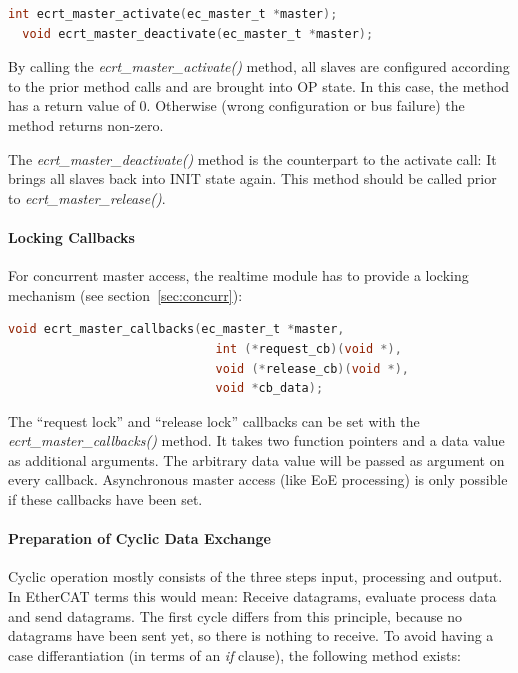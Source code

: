\documentclass[a4paper,12pt,BCOR6mm,bibtotoc,idxtotoc]{scrbook}
\begin{document}
\begin{lstlisting}[language=C]
  int ecrt_master_activate(ec_master_t *master);
  void ecrt_master_deactivate(ec_master_t *master);
\end{lstlisting}

By calling the \textit{ecrt\_master\_activate()} method, all slaves
are configured according to the prior method calls and are brought
into OP state. In this case, the method has a return value of 0.
Otherwise (wrong configuration or bus failure) the method returns
non-zero.

The \textit{ecrt\_master\_deactivate()} method is the counterpart to
the activate call: It brings all slaves back into INIT state again.
This method should be called prior to
\textit{ecrt\_\-master\_\-release()}.

\paragraph{Locking Callbacks}

For concurrent master access, the realtime module has to provide a
locking mechanism (see section~\ref{sec:concurr}):

\begin{lstlisting}[language=C]
  void ecrt_master_callbacks(ec_master_t *master,
                             int (*request_cb)(void *),
                             void (*release_cb)(void *),
                             void *cb_data);
\end{lstlisting}

The ``request lock'' and ``release lock'' callbacks can be set with
the \textit{ecrt\_master\_call\-backs()} method. It takes two function
pointers and a data value as additional arguments. The arbitrary data
value will be passed as argument on every callback. Asynchronous
master access (like EoE processing) is only possible if these
callbacks have been set.

\paragraph{Preparation of Cyclic Data Exchange}

Cyclic operation mostly consists of the three steps input, processing
and output. In EtherCAT terms this would mean: Receive datagrams,
evaluate process data and send datagrams. The first cycle differs from
this principle, because no datagrams have been sent yet, so there is
nothing to receive. To avoid having a case differantiation (in terms
of an \textit{if} clause), the following method exists:
\end{document}
